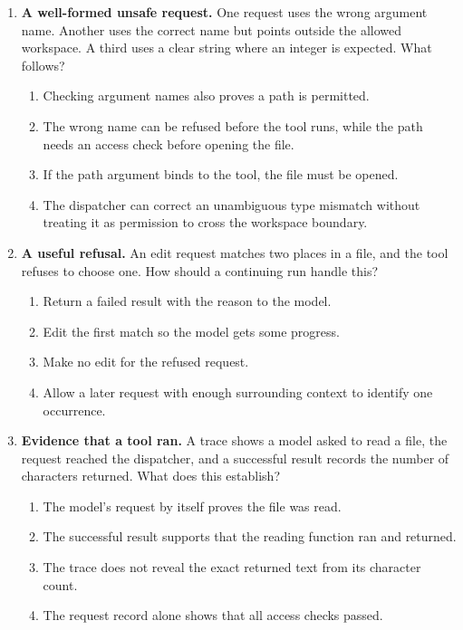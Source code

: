 \begin{enumerate}[start=31,itemsep=0.7\baselineskip]
\item\label{exercise:35} \begin{minipage}[t]{\linewidth}
\textbf{A well-formed unsafe request.} One request uses the wrong argument name. Another uses the correct name but points outside the allowed workspace. A third uses a clear string where an integer is expected. What follows?
\begin{enumerate}[label=\textnormal{(\Alph*)},leftmargin=*,itemsep=0pt]
\item Checking argument names also proves a path is permitted.
\item The wrong name can be refused before the tool runs, while the path needs an access check before opening the file.
\item If the path argument binds to the tool, the file must be opened.
\item The dispatcher can correct an unambiguous type mismatch without treating it as permission to cross the workspace boundary.
\end{enumerate}
\end{minipage}

\item\label{exercise:36} \begin{minipage}[t]{\linewidth}
\textbf{A useful refusal.} An edit request matches two places in a file, and the tool refuses to choose one. How should a continuing run handle this?
\begin{enumerate}[label=\textnormal{(\Alph*)},leftmargin=*,itemsep=0pt]
\item Return a failed result with the reason to the model.
\item Edit the first match so the model gets some progress.
\item Make no edit for the refused request.
\item Allow a later request with enough surrounding context to identify one occurrence.
\end{enumerate}
\end{minipage}

\item\label{exercise:37} \begin{minipage}[t]{\linewidth}
\textbf{Evidence that a tool ran.} A trace shows a model asked to read a file, the request reached the dispatcher, and a successful result records the number of characters returned. What does this establish?
\begin{enumerate}[label=\textnormal{(\Alph*)},leftmargin=*,itemsep=0pt]
\item The model's request by itself proves the file was read.
\item The successful result supports that the reading function ran and returned.
\item The trace does not reveal the exact returned text from its character count.
\item The request record alone shows that all access checks passed.
\end{enumerate}
\end{minipage}


\end{enumerate}

